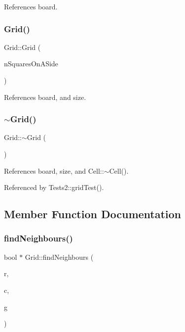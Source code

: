 References board.

\mbox{\label{classGrid_af35b0accda3471400d55eae5ea07cd40}} 
\subsubsection{Grid()\hspace{0.1cm}{\footnotesize\ttfamily [2/2]}}
{\footnotesize\ttfamily Grid\+::\+Grid (\begin{DoxyParamCaption}\item[{int}]{n\+Squares\+On\+A\+Side }\end{DoxyParamCaption})}



References board, and size.

\mbox{\label{classGrid_a3661d0a7f998caaaf8627d7a67072116}} 
\subsubsection{$\sim$\+Grid()}
{\footnotesize\ttfamily Grid\+::$\sim$\+Grid (\begin{DoxyParamCaption}{ }\end{DoxyParamCaption})\hspace{0.3cm}{\ttfamily [virtual]}}



References board, size, and Cell\+::$\sim$\+Cell().



Referenced by Tests2\+::grid\+Test().



\subsection{Member Function Documentation}
\mbox{\label{classGrid_afcdc34ab2dc4a3304a60dc6b17c16d6d}} 
\subsubsection{find\+Neighbours()}
{\footnotesize\ttfamily bool $\ast$ Grid\+::find\+Neighbours (\begin{DoxyParamCaption}\item[{int}]{r,  }\item[{int}]{c,  }\item[{\textbf{ occupation\+Status}}]{g }\end{DoxyParamCaption})}



